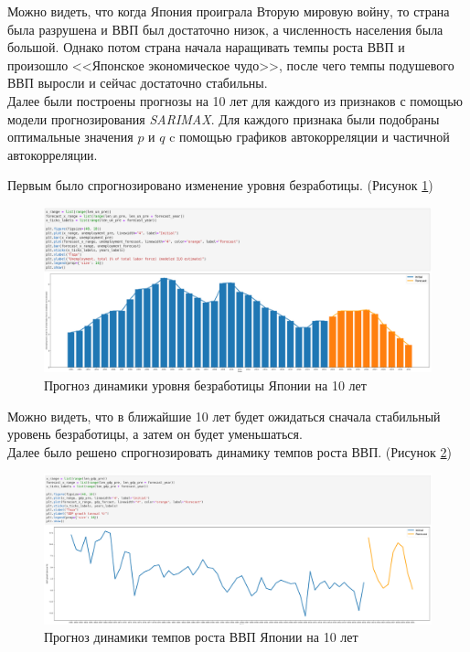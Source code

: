 \documentclass[14pt,fleqn]{extarticle}
\begin{document}
	Можно видеть, что когда Япония проиграла Вторую мировую войну, то страна была разрушена и ВВП был достаточно низок, а численность населения была большой. Однако потом страна начала наращивать темпы роста ВВП и произошло <<Японское экономическое чудо>>, после чего темпы подушевого ВВП выросли и сейчас достаточно стабильны.\\
	
	Далее были построены прогнозы на 10 лет для каждого из признаков с помощью модели прогнозирования \textit{SARIMAX}. Для каждого признака были подобраны оптимальные значения $p$ и $q$ c помощью графиков автокорреляции и частичной автокорреляции.\\
	
	\newpage
	
	Первым было спрогнозировано изменение уровня безработицы. (Рисунок \ref{fig:japan_unemployment_plot_forecast})
	
	\begin{figure}[h]
		\centering \includegraphics[scale=0.42]{japan_unemployment_plot_forecast}
		\caption{Прогноз динамики уровня безработицы Японии на 10 лет}
		\label{fig:japan_unemployment_plot_forecast}
	\end{figure}

	Можно видеть, что в ближайшие 10 лет будет ожидаться сначала стабильный уровень безработицы, а затем он будет уменьшаться.\\
	
	Далее было решено спрогнозировать динамику темпов роста ВВП. (Рисунок \ref{fig:japan_gdp_growth_forecast})
	
	\begin{figure}[h]
		\centering \includegraphics[scale=0.3]{japan_gdp_growth_forecast}
		\caption{Прогноз динамики темпов роста ВВП Японии на 10 лет}
		\label{fig:japan_gdp_growth_forecast}
	\end{figure}
\end{document}
